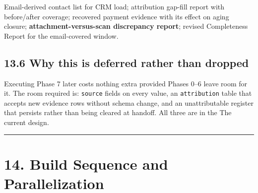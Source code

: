 \documentclass[
]{article}
\begin{document}
Email-derived contact list for CRM load; attribution gap-fill report
with before/after coverage; recovered payment evidence with its effect
on aging closure; \textbf{attachment-versus-scan discrepancy report};
revised Completeness Report for the email-covered window.

\subsection{13.6 Why this is deferred rather than
dropped}\label{why-this-is-deferred-rather-than-dropped}

Executing Phase 7 later costs nothing extra provided Phases 0--6 leave
room for it. The room required is: \texttt{source} fields on every
value, an \texttt{attribution} table that accepts new evidence rows
without schema change, and an unattributable register that persists
rather than being cleared at handoff. All three are in the The current
design.

\begin{center}\rule{0.5\linewidth}{0.5pt}\end{center}

\section{14. Build Sequence and
Parallelization}\label{build-sequence-and-parallelization}
\end{document}
